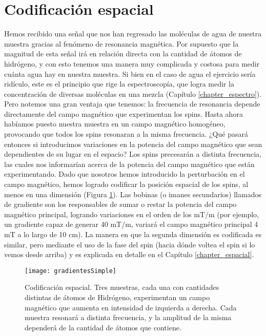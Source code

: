 \section{Codificación espacial}
\label{sec_codificacionEspacial}
Hemos recibido una señal que nos han regresado las moléculas de agua de nuestra muestra gracias al fenómeno de resonancia magnética. Por supuesto que la magnitud de esta señal irá en relación directa con la cantidad de átomos de hidrógeno, y con esto tenemos una manera muy complicada y costosa para medir cuánta agua hay en nuestra muestra. Si bien en el caso de agua el ejercicio sería ridículo, este es el principio que rige la espectroscopía, que logra medir la concentración de diversas moléculas en una mezcla (Capítulo \ref{chapter_espectro}). Pero notemos una gran ventaja que tenemos: la frecuencia de resonancia depende directamente del campo magnético que experimentan los spins. Hasta ahora habíamos puesto nuestra muestra en un campo magnético homogéneo, provocando que todos los spins resonaran a la misma frecuencia. ¿Qué pasará entonces si introducimos variaciones en la potencia del campo magnético que sean dependientes de su lugar en el espacio? Los spins precesarán a distinta frecuencia, las cuales nos informarían acerca de la potencia del campo magnético que están experimentando. Dado que nosotros hemos introducido la perturbación en el campo magnético, hemos logrado codificar la posición espacial de los spins, al menos en una dimensión (Figura \ref{fig:gradientesSimple}). Las bobinas (o imanes secundarios) llamados de gradiente son los responsables de sumar o restar la potencia del campo magnético principal, logrando variaciones en el orden de los mT/m (por ejemplo, un gradiente capaz de generar 40 mT/m, variará el campo magnético principal 4 mT a lo largo de 10 cm). La manera en que la segunda dimensión es codificada es similar, pero mediante el uso de la fase del spin (hacia dónde voltea el spin si lo vemos desde arriba) y es explicada en detalle en el Capítulo \ref{chapter_espacial}.

\begin{figure}[htb]
 \centering
 \texttt{[image: gradientesSimple]}
 \caption{Codificación espacial. Tres muestras, cada una con cantidades distintas de átomos de Hidrógeno, experimentan un campo magnético que aumenta en intensidad de izquierda a derecha. Cada muestra resonará a distinta frecuencia, y la amplitud de la misma dependerá de la cantidad de átomos que contiene.}
 \label{fig:gradientesSimple}
\end{figure}




